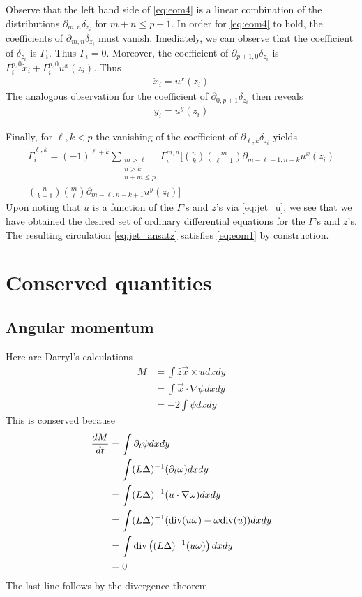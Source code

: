 \documentclass[12pt]{amsart}
\begin{document}
Observe that the left hand side of \eqref{eq:eom4}
is a linear combination of the distributions
$\partial_{m,n}\delta_{z_i}$ for $m+n \leq p+1$.
In order for \eqref{eq:eom4} to hold, the coefficients of $\partial_{m,n} \delta_{z_i}$ must vanish.
Imediately, we can observe that the coefficient of $\delta_{z_i}$ is $\dot{\Gamma}_i$.
Thus $\dot{\Gamma}_i = 0$.
Moreover, the coefficient of $\partial_{p+1,0} \delta_{z_i}$ is 
$\Gamma_i^{p,0} \dot{x}_i + \Gamma_i^{p,0} u^x(z_i)$.
Thus
\begin{align*}
  \dot{x}_i = u^x(z_i)
\end{align*}
The analogous observation for the coefficient of $\partial_{0,p+1} \delta_{z_i}$ then reveals
\begin{align*}
  \dot{y}_i = u^y(z_i)
\end{align*}

Finally, for $\ell,k < p$ the vanishing of the coefficient of $\partial_{\ell,k} \delta_{z_i}$ yields
\begin{align*}
  \dot{\Gamma}_i^{\ell,k} = (-1)^{\ell + k}
  \sum_{
    \substack{
      m > \ell \\
      n > k \\
      n+m \leq p}
    }\Gamma_i^{m,n} \Big[  \binom{n}{k} \binom{m}{\ell-1} \partial_{m-\ell+1,n-k} u^x(z_i) \\
   \binom{n}{k-1} \binom{m}{\ell} \partial_{m-\ell,n-k+1} u^y(z_i)  \Big]
\end{align*}
Upon noting that $u$ is a function of the $\Gamma$'s and $z$'s via \eqref{eq:jet_u},
we see that we have obtained the desired set of ordinary differential equations for the $\Gamma$'s and $z$'s.
The resulting circulation \eqref{eq:jet_ansatz} satisfies \eqref{eq:eom1} by construction.

\section{Conserved quantities}
\label{sec:conserved_quantities}

\subsection{Angular momentum}
\label{sec:angular_momentum}
Here are Darryl's calculations
\begin{align*}
  M &= \int \hat{z} \vec{x} \times u dx dy \\
  &= \int \vec{x} \cdot \nabla \psi dx dy \\
  &= -2 \int \psi dx dy 
\end{align*}
This is conserved because
\begin{align*}
  \frac{dM}{dt} &= \int \partial_t \psi dx dy\\
  &= \int (L\Delta)^{-1} (\partial_t \omega) dx dy \\
  &= \int (L \Delta)^{-1} ( u \cdot \nabla \omega) dx dy \\
  &= \int (L \Delta)^{-1} ( {\rm div}( u \omega) - \omega {\rm div}(u) ) dxdy \\
  &= \int {\rm div} \left( (L\Delta)^{-1}( u \omega) \right) dx dy \\
   &= 0
\end{align*}
The last line follows by the divergence theorem.
\end{document}
